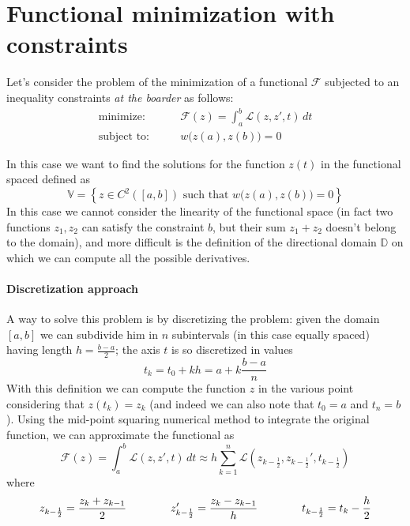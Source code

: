 \section{Functional minimization with constraints}
	Let's consider the problem of the minimization of a functional $\mathcal F$ subjected to an inequality constraints \textit{at the boarder} as follows:
	\begin{equation} \label{eq:func:origconst}
	\begin{aligned} 
		\textrm{minimize:}& \qquad \mathcal F(z) = \int_a^b \mathcal L(z,z',t)\, dt \\
		\textrm{subject to:}& \qquad w\big(z(a),z(b) \big) = 0
	\end{aligned}
	\end{equation}

	In this case we want to find the solutions for the function $z(t)$ in the functional spaced defined as
	\[\mathds V = \left\{ z \in C^2([a,b]) \textrm{ such that } w\big(z(a),z(b)\big) = 0 \right\}  \]
	In this case we cannot consider the linearity of the functional space (in fact two functions $z_1,z_2$ can satisfy the constraint $b$, but their sum $z_1 + z_2$ doesn't belong to the domain), and more difficult is the definition of the directional domain $\mathds D$ on which we can compute all the possible derivatives. 
	
	\paragraph{Discretization approach} A way to solve this problem is by discretizing the problem: given the domain $[a,b]$ we can subdivide him in $n$ subintervals (in this case equally spaced) having length $h = \frac{b-a}{2}$; the axis $t$ is so discretized in values
	\[ t_k = t_0 + k h = a + k \frac {b-a}n  \]
	With this definition we can compute the function $z$ in the various point considering that $z(t_k)=z_k$ (and indeed we can also note that $t_0 = a$ and $t_n = b$). Using the mid-point squaring numerical method to integrate the original function, we can approximate the functional as
	\[ \mathcal F(z) = \int_a^b \mathcal L(z,z',t)\, dt \approx h \sum_{k=1}^{n} \mathcal L \left( z_{k-\frac 1 2}, z_{k-\frac 1 2}', t_{k-\frac 1 2} \right) \]
	where 
	\[ z_{k-\frac 12} = \frac{z_k + z_{k-1}}{2} \qquad \qquad z_{k-\frac 12} ' = \frac{z_k - z_{k-1}}{h} \qquad \qquad t_{k-\frac 12} = t_k - \frac h 2 \]
	

